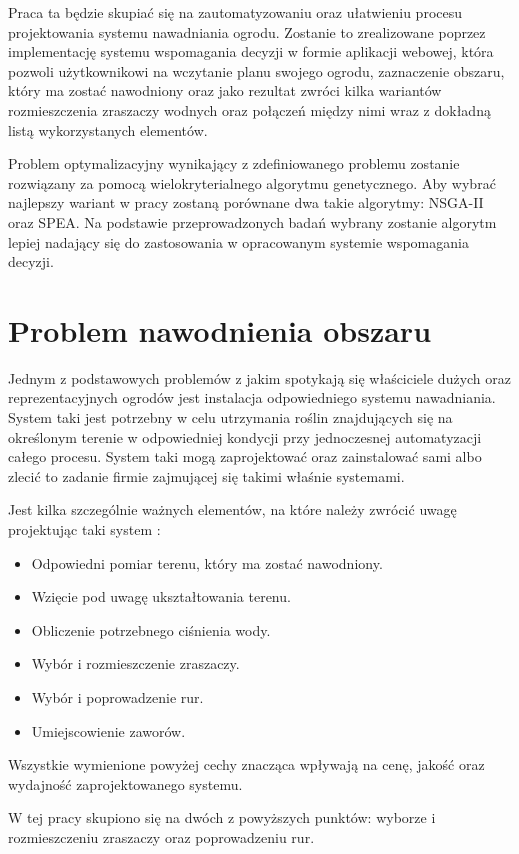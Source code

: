 \documentclass[twoside]{iisthesis}
\begin{document}
Praca ta będzie skupiać się na zautomatyzowaniu oraz ułatwieniu procesu projektowania systemu nawadniania ogrodu. Zostanie to zrealizowane poprzez implementację systemu wspomagania decyzji w formie aplikacji webowej, która pozwoli użytkownikowi na wczytanie planu swojego ogrodu, zaznaczenie obszaru, który ma zostać nawodniony oraz jako rezultat zwróci kilka wariantów rozmieszczenia zraszaczy wodnych oraz połączeń między nimi wraz z dokładną listą wykorzystanych elementów.

Problem optymalizacyjny wynikający z zdefiniowanego problemu zostanie rozwiązany za pomocą wielokryterialnego algorytmu genetycznego. Aby wybrać najlepszy wariant w pracy zostaną porównane dwa takie algorytmy: NSGA-II oraz SPEA. Na podstawie przeprowadzonych badań wybrany zostanie algorytm lepiej nadający się do zastosowania w opracowanym systemie wspomagania decyzji.
\section{Problem nawodnienia obszaru}
Jednym z podstawowych problemów z jakim spotykają się właściciele dużych oraz reprezentacyjnych ogrodów jest instalacja odpowiedniego systemu nawadniania. System taki jest potrzebny w celu utrzymania roślin znajdujących się na określonym terenie w odpowiedniej kondycji przy jednoczesnej automatyzacji całego procesu. System taki mogą zaprojektować oraz zainstalować sami albo zlecić to zadanie firmie zajmującej się takimi właśnie systemami.

Jest kilka szczególnie ważnych elementów, na które należy zwrócić uwagę projektując taki system \cite{irrigation_plan}:\\
\begin{itemize}
	\item Odpowiedni pomiar terenu, który ma zostać nawodniony.
	\item Wzięcie pod uwagę ukształtowania terenu.
	\item Obliczenie potrzebnego ciśnienia wody.
	\item Wybór i rozmieszczenie zraszaczy.
	\item Wybór i poprowadzenie rur.
	\item Umiejscowienie zaworów.\\
\end{itemize}
Wszystkie wymienione powyżej cechy znacząca wpływają na cenę, jakość oraz wydajność zaprojektowanego systemu.

W tej pracy skupiono się na dwóch z powyższych punktów: wyborze i rozmieszczeniu zraszaczy oraz poprowadzeniu rur.
\end{document}
